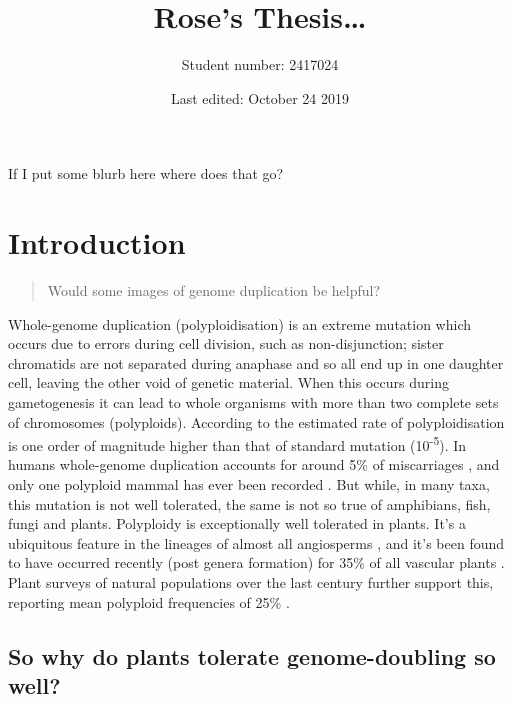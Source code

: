 \documentclass[openany, 12pt, draft]{book}
\title{Rose's Thesis\ldots{}}
\author{Student number: 2417024}
\date{Last edited: October 24 2019}
\begin{document}
\maketitle

{
\setcounter{tocdepth}{1}
\tableofcontents
}
If I put some blurb here where does that go?

\hypertarget{intro}{%
\chapter{Introduction}\label{intro}}

\begin{quote}
Would some images of genome duplication be helpful?
\end{quote}

Whole-genome duplication (polyploidisation) is an extreme mutation which occurs due to errors during cell division, such as non-disjunction; sister chromatids are not separated during anaphase and so all end up in one daughter cell, leaving the other void of genetic material.
When this occurs during gametogenesis it can lead to whole organisms with more than two complete sets of chromosomes (polyploids).
According to \citet{REFNEEDED} the estimated rate of polyploidisation is one order of magnitude higher than that of standard mutation (10\textsuperscript{-5}).
In humans whole-genome duplication accounts for around 5\% of miscarriages \citep{REFNEEDED}, and only one polyploid mammal has ever been recorded \citep{REFNEEDED}.
But while, in many taxa, this mutation is not well tolerated, the same is not so true of amphibians, fish, fungi and plants.
Polyploidy is exceptionally well tolerated in plants. It's a ubiquitous feature in the lineages of almost all angiosperms \citep{Jiao2011}, and it's been found to have occurred recently (post genera formation) for 35\% of all vascular plants \citep{Wood2009}.
Plant surveys of natural populations over the last century further support this, reporting mean polyploid frequencies of 25\% \citep{REFNEEDED}.

\hypertarget{so-why-do-plants-tolerate-genome-doubling-so-well}{%
\section{So why do plants tolerate genome-doubling so well?}\label{so-why-do-plants-tolerate-genome-doubling-so-well}}
\end{document}
